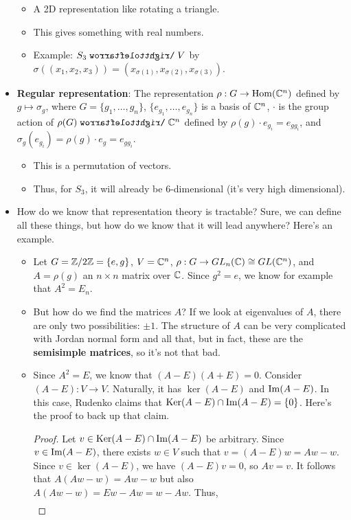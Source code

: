 \documentclass[../notes.tex]{subfiles}
\begin{document}
\begin{itemize}
    \begin{itemize}
        \item A 2D representation like rotating a triangle.
        \item This gives something with real numbers.
        \item Example: $S_3\acts V$ by $\sigma((x_1,x_2,x_3))=(x_{\sigma(1)},x_{\sigma(2)},x_{\sigma(3)})$.
    \end{itemize}
    \item \textbf{Regular representation}: The representation $\rho:G\to\operatorname{Hom}(\mathbb{C}^n)$ defined by $g\mapsto\sigma_g$, where $G=\{g_1,\dots,g_n\}$, $\{e_{g_1},\dots,e_{g_n}\}$ is a basis of $\mathbb{C}^n$, $\cdot$ is the group action of $\rho(G)\acts\C^n$ defined by $\rho(g)\cdot e_{g_i}=e_{gg_i}$, and $\sigma_g(e_{g_i})=\rho(g)\cdot e_g=e_{gg_i}$.
    \begin{itemize}
        \item This is a permutation of vectors.
        \item Thus, for $S_3$, it will already be 6-dimensional (it's very high dimensional).
    \end{itemize}
    \item How do we know that representation theory is tractable? Sure, we can define all these things, but how do we know that it will lead anywhere? Here's an example.
    \begin{itemize}
        \item Let $G=\mathbb{Z}/2\mathbb{Z}=\{e,g\}$, $V=\mathbb{C}^n$, $\rho:G\to GL_n(\mathbb{C})\cong GL(\mathbb{C}^n)$, and $A=\rho(g)$ an $n\times n$ matrix over $\mathbb{C}$. Since $g^2=e$, we know for example that $A^2=E_n$.
        \item But how do we find the matrices $A$?
        If we look at eigenvalues of $A$, there are only two possibilities: $\pm 1$. The structure of $A$ can be very complicated with Jordan normal form and all that, but in fact, these are the \textbf{semisimple matrices}, so it's not that bad.
        \item Since $A^2=E$, we know that $(A-E)(A+E)=0$. Consider $(A-E):V\to V$. Naturally, it has $\ker(A-E)$ and $\operatorname{Im}(A-E)$. In this case, Rudenko claims that $\operatorname{Ker}(A-E)\cap\operatorname{Im}(A-E)=\{0\}$. Here's the proof to back up that claim.
        \begin{proof}
            Let $v\in\operatorname{Ker}(A-E)\cap\operatorname{Im}(A-E)$ be arbitrary. Since $v\in\operatorname{Im}(A-E)$, there exists $w\in V$ such that $v=(A-E)w=Aw-w$. Since $v\in\ker(A-E)$, we have $(A-E)v=0$, so $Av=v$. It follows that $A(Aw-w)=Aw-w$ but also $A(Aw-w)=Ew-Aw=w-Aw$. Thus,
            \begin{align*}

\end{align*}
\end{proof}
\end{itemize}
\end{itemize}
\end{document}
